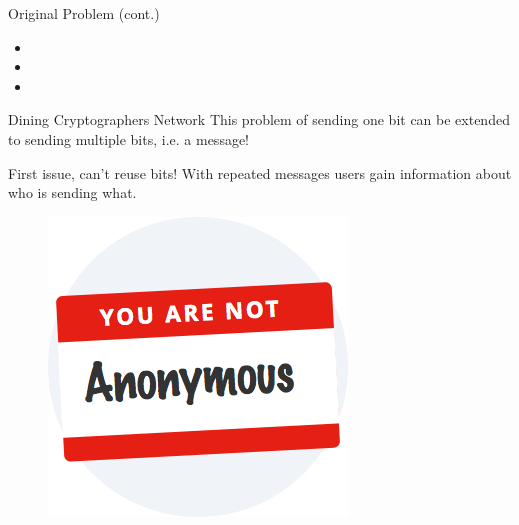 \documentclass{beamer}
\begin{document}
\begin{frame}{Original Problem (cont.)}
\begin{itemize}
    \item {}
    \item {}
    \item {}
\end{itemize}
\begin{figure}
    \hfill
\end{figure}
\end{frame}

\begin{frame}{Dining Cryptographers Network}
This problem of sending one bit can be extended to sending multiple bits, i.e. a
message!

First issue, can't reuse bits! With repeated messages users gain information
about who is sending what.

\begin{figure}
    \includegraphics[width=0.5\linewidth]{NotAnonymous.png}
\end{figure}
\end{frame}
\end{document}
